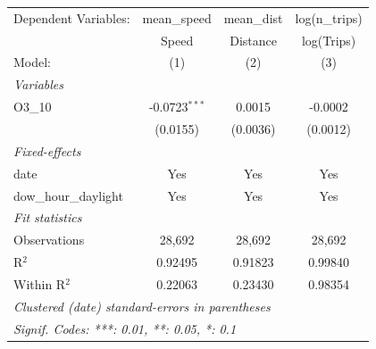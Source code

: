 \begingroup
\centering
\begin{tabular}{lccc}
   \tabularnewline \midrule \midrule
   Dependent Variables:  & mean\_speed     & mean\_dist  & log(n\_trips)\\   
                         & Speed           & Distance    & log(Trips) \\   
   Model:                & (1)             & (2)         & (3)\\  
   \midrule
   \emph{Variables}\\
   O3\_10                & -0.0723$^{***}$ & 0.0015      & -0.0002\\   
                         & (0.0155)        & (0.0036)    & (0.0012)\\   
   \midrule
   \emph{Fixed-effects}\\
   date                  & Yes             & Yes         & Yes\\  
   dow\_hour\_daylight   & Yes             & Yes         & Yes\\  
   \midrule
   \emph{Fit statistics}\\
   Observations          & 28,692          & 28,692      & 28,692\\  
   R$^2$                 & 0.92495         & 0.91823     & 0.99840\\  
   Within R$^2$          & 0.22063         & 0.23430     & 0.98354\\  
   \midrule \midrule
   \multicolumn{4}{l}{\emph{Clustered (date) standard-errors in parentheses}}\\
   \multicolumn{4}{l}{\emph{Signif. Codes: ***: 0.01, **: 0.05, *: 0.1}}\\
\end{tabular}
\par\endgroup

